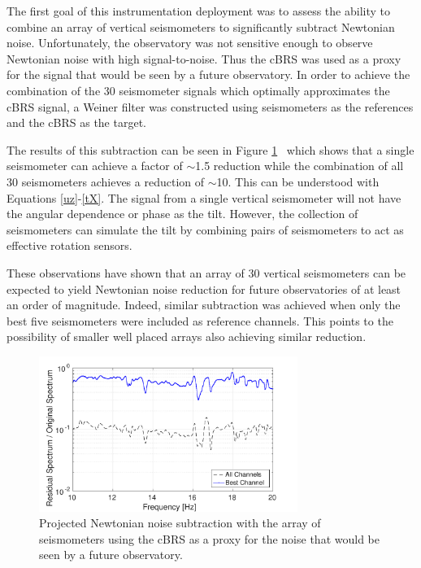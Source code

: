 \documentclass [12pt, proquest]{uwthesis}[2019]
\begin{document}
The first goal of this instrumentation deployment was to assess the ability to combine an array of vertical seismometers to significantly subtract Newtonian noise. Unfortunately, the observatory was not sensitive enough to observe Newtonian noise with high signal-to-noise. Thus the cBRS was used as a proxy for the signal that would be seen by a future observatory. In order to achieve the combination of the 30 seismometer signals which optimally approximates the cBRS signal, a Weiner filter was constructed using seismometers as the references and the cBRS as the target. 

The results of this subtraction can be seen in Figure \ref{NNSub}~\cite{NN} which shows that a single seismometer can achieve a factor of $\sim$1.5 reduction while the combination of all 30 seismometers achieves a reduction of $\sim$10. This can be understood with Equations \ref{uz}-\ref{tX}. The signal from a single vertical seismometer will not have the angular dependence or phase as the tilt. However, the collection of seismometers can simulate the tilt by combining pairs of seismometers to act as effective rotation sensors.

These observations have shown that an array of 30 vertical seismometers can be expected to yield Newtonian noise reduction for future observatories of at least an order of magnitude. Indeed, similar subtraction was achieved when only the best five seismometers were included as reference channels. This points to the possibility of smaller well placed arrays also achieving similar reduction.

\begin{figure}[!h]
\begin{center}
\includegraphics[width=0.75\textwidth]{NNSubtraction.pdf}
\end{center}
\caption[Projected Newtonian noise subtraction with the array of seismometers]{Projected Newtonian noise subtraction with the array of seismometers using the cBRS as a proxy for the noise that would be seen by a future observatory.}
\label{NNSub}
\end{figure}
\end{document}
